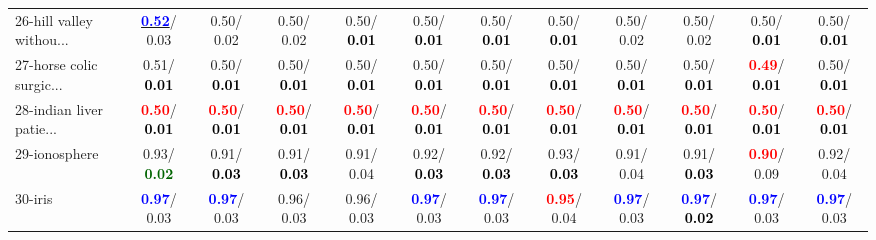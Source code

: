 \begin{table}[h]
\begin{center}
{\begin{tabular}{lc|c|c|c|c|c|c|c|c|c|c}
26-hill valley withou... & \underline{\textcolor{blue}{\textbf{  0.52}}}/  0.03 &   0.50/  0.02 &   0.50/  0.02 &   0.50/\textcolor{black}{\textbf{  0.01}} &   0.50/\textcolor{black}{\textbf{  0.01}} &   0.50/\textcolor{black}{\textbf{  0.01}} &   0.50/\textcolor{black}{\textbf{  0.01}} &   0.50/  0.02 &   0.50/  0.02 &   0.50/\textcolor{black}{\textbf{  0.01}} &   0.50/\textcolor{black}{\textbf{  0.01}} \\
27-horse colic surgic... &   0.51/\textcolor{black}{\textbf{  0.01}} &   0.50/\textcolor{black}{\textbf{  0.01}} &   0.50/\textcolor{black}{\textbf{  0.01}} &   0.50/\textcolor{black}{\textbf{  0.01}} &   0.50/\textcolor{black}{\textbf{  0.01}} &   0.50/\textcolor{black}{\textbf{  0.01}} &   0.50/\textcolor{black}{\textbf{  0.01}} &   0.50/\textcolor{black}{\textbf{  0.01}} &   0.50/\textcolor{black}{\textbf{  0.01}} & \textcolor{red}{\textbf{  0.49}}/\textcolor{black}{\textbf{  0.01}} &   0.50/\textcolor{black}{\textbf{  0.01}} \\
28-indian liver patie... & \textcolor{red}{\textbf{  0.50}}/\textcolor{black}{\textbf{  0.01}} & \textcolor{red}{\textbf{  0.50}}/\textcolor{black}{\textbf{  0.01}} & \textcolor{red}{\textbf{  0.50}}/\textcolor{black}{\textbf{  0.01}} & \textcolor{red}{\textbf{  0.50}}/\textcolor{black}{\textbf{  0.01}} & \textcolor{red}{\textbf{  0.50}}/\textcolor{black}{\textbf{  0.01}} & \textcolor{red}{\textbf{  0.50}}/\textcolor{black}{\textbf{  0.01}} & \textcolor{red}{\textbf{  0.50}}/\textcolor{black}{\textbf{  0.01}} & \textcolor{red}{\textbf{  0.50}}/\textcolor{black}{\textbf{  0.01}} & \textcolor{red}{\textbf{  0.50}}/\textcolor{black}{\textbf{  0.01}} & \textcolor{red}{\textbf{  0.50}}/\textcolor{black}{\textbf{  0.01}} & \textcolor{red}{\textbf{  0.50}}/\textcolor{black}{\textbf{  0.01}} \\ \hline
29-ionosphere &   0.93/\textcolor{darkgreen}{\textbf{  0.02}} &   0.91/\textcolor{black}{\textbf{  0.03}} &   0.91/\textcolor{black}{\textbf{  0.03}} &   0.91/  0.04 &   0.92/\textcolor{black}{\textbf{  0.03}} &   0.92/\textcolor{black}{\textbf{  0.03}} &   0.93/\textcolor{black}{\textbf{  0.03}} &   0.91/  0.04 &   0.91/\textcolor{black}{\textbf{  0.03}} & \textcolor{red}{\textbf{  0.90}}/  0.09 &   0.92/  0.04 \\
30-iris & \textcolor{blue}{\textbf{  0.97}}/  0.03 & \textcolor{blue}{\textbf{  0.97}}/  0.03 &   0.96/  0.03 &   0.96/  0.03 & \textcolor{blue}{\textbf{  0.97}}/  0.03 & \textcolor{blue}{\textbf{  0.97}}/  0.03 & \textcolor{red}{\textbf{  0.95}}/  0.04 & \textcolor{blue}{\textbf{  0.97}}/  0.03 & \textcolor{blue}{\textbf{  0.97}}/\textcolor{black}{\textbf{  0.02}} & \textcolor{blue}{\textbf{  0.97}}/  0.03 & \textcolor{blue}{\textbf{  0.97}}/  0.03 \\

\end{tabular}}
\end{center}
\end{table}
